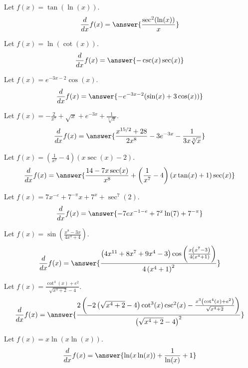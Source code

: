 \documentclass{ximera}
\begin{document}
\begin{shuffle}
\begin{exercise}
Let $f(x)=\tan (\ln (x))$.
\[
\ddx f(x) = \answer{\frac{\sec ^2(\ln (x))}{x}}
\]
\end{exercise}

\begin{exercise}
Let $f(x)=\ln (\cot (x))$.
\[
\ddx f(x) = \answer{-\csc (x) \sec (x)}
\]
\end{exercise}

\begin{exercise}
Let $f(x)=e^{-3 x-2} \cos (x)$.
\[
\ddx f(x) = \answer{-e^{-3 x-2} (\sin (x)+3 \cos (x))}
\]
\end{exercise}

\begin{exercise}
Let $f(x)=-\frac{2}{x^7}+\sqrt{x}+e^{-3 x}+\frac{1}{\sqrt[3]{x}}$.
\[
\ddx f(x) = \answer{\frac{x^{15/2}+28}{2 x^8}-3 e^{-3 x}-\frac{1}{3 x \sqrt[3]{x}}}
\]
\end{exercise}

\begin{exercise}
Let $f(x)=\left(\frac{1}{x^7}-4\right) (x \sec (x)-2)$.
\[
\ddx f(x) = \answer{\frac{14-7 x \sec (x)}{x^8}+\left(\frac{1}{x^7}-4\right) (x \tan (x)+1) \sec (x)}
\]
\end{exercise}

\begin{exercise}
Let $f(x)=7 x^{-e}+7^{-\pi } x+7^x+\sec ^7(2)$.
\[
\ddx f(x) = \answer{-7 e x^{-1-e}+7^x \ln (7)+7^{-\pi }}
\]
\end{exercise}

\begin{exercise}
Let $f(x)=\sin \left(\frac{x^8-3 x}{4 x^4+4}\right)$.
\[
\ddx f(x) = \answer{\frac{\left(4 x^{11}+8 x^7+9 x^4-3\right) \cos \left(\frac{x \left(x^7-3\right)}{4 \left(x^4+1\right)}\right)}{4 \left(x^4+1\right)^2}}
\]
\end{exercise}

\begin{exercise}
Let $f(x)=\frac{\cot ^4(x)+e^2}{\sqrt{x^4+2}-4}$.
\[
\ddx f(x) = \answer{\frac{2 \left(-2 \left(\sqrt{x^4+2}-4\right) \cot ^3(x) \csc ^2(x)-\frac{x^3 \left(\cot ^4(x)+e^2\right)}{\sqrt{x^4+2}}\right)}{\left(\sqrt{x^4+2}-4\right)^2}}
\]
\end{exercise}

\begin{exercise}
Let $f(x)=x \ln (x \ln (x))$.
\[
\ddx f(x) = \answer{\ln (x \ln (x))+\frac{1}{\ln (x)}+1}
\]
\end{exercise}


\end{shuffle}
\end{document}
